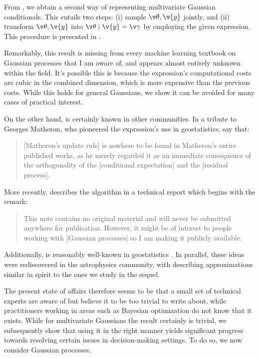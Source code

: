 \documentclass[11pt]{book}
\begin{document}
From , we obtain a second way of representing multivariate Gaussian conditionals.
This entails two steps: (i) sample $\v\theta,\v{y}$ jointly, and (ii) transform $\v\theta,\v{y}$ into $\v\theta\given\v{y}=\v\gamma$ by employing the given expression.
This procedure is presented in .

Remarkably, this result is missing from every machine learning textbook on Gaussian processes that I am aware of, and appears almost entirely unknown within the field.
It's possible this is because the expression's computational costs are cubic in the combined dimension, which is more expensive than the previous costs.
While this holds for general Gaussians, we show it can be avoided for many cases of practical interest.

On the other hand,  is certainly known in other communities.
In a tribute to Georges Matheron, who pioneered the expression's use in geostatistics, \textcite{chiles05} say that:

\begin{quotation}
[Matheron's update rule] is nowhere to be found in Matheron's entire published works, as he merely regarded it as an immediate consequence of the orthogonality of the [conditional expectation] and the [residual process].
\end{quotation}

More recently, \textcite{doucet10} describes the algorithm in a technical report which begins with the remark: 

\begin{quotation}
This note contains no original material and will never be submitted anywhere for publication. However, it might be of interest to people working with [Gaussian processes] so I am making it publicly available.
\end{quotation}

Additionally,  is reasonably well-known in geostatistics \cite{journel78,defouquet94,emery07,oliver96}.
In parallel, these ideas were rediscovered in the astrophysics community, with \textcite{hoffman91} describing approximations similar in spirit to the ones we study in the sequel.

The present state of affairs therefore seems to be that a small set of technical experts are aware of  but believe it to be too trivial to write about, while practitioners working in areas such as Bayesian optimization do not know that it exists.
While for multivariate Gaussians the result certainly is trivial, we subsequently show that using it in the right manner yields significant progress towards resolving certain issues in decision-making settings.
To do so, we now consider Gaussian processes.
\end{document}
